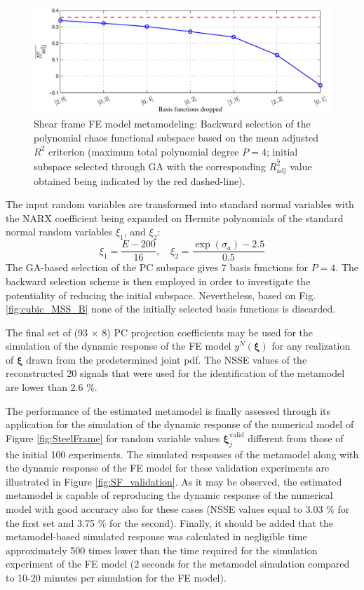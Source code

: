 \documentclass[preprint,3p,review,times,11pt]{elsarticle}
\newcommand{\beq}{\begin{equation}}
\newcommand{\eeq}{\end{equation}}
\newcommand{\bld}[1]{\boldsymbol{#1}}
\newcommand{\bxi}{\bld{\xi}}
\begin{document}
\begin{figure}[t!]
\begin{center}
\includegraphics[width = 1\textwidth]{figs/SF_MSS_StageB.pdf}
\caption{Shear frame FE model metamodeling: Backward selection of the polynomial chaos functional subspace based on the mean adjusted $R^2$ criterion (maximum total polynomial degree $P=4$; initial subspace selected through GA with the corresponding $\overline{R^2_\text{adj}}$ value obtained being indicated by the red dashed-line).} \label{fig:boucwen_MSS_B}
\end{center}
\end{figure}


The input random variables are transformed into standard normal variables with the NARX coefficient being expanded on Hermite polynomials of the standard normal random variables $\xi_1$, and $\xi_2$:
\beq \xi_1 =  \frac{E - 200}{16} , \quad \xi_2 =  \frac{\exp(\sigma_a) - 2.5}{0.5}\eeq 
The GA-based selection of the PC subspace gives 7 basis functions for $P = 4$. The backward selection scheme is then employed in order to investigate the potentiality of reducing the initial subspace. Nevertheless, based on Fig. \ref{fig:cubic_MSS_B} none of the initially selected basis functions is discarded.   
 
The final set of (93 $\times$ 8) PC projection coefficients may be used for the simulation of the dynamic response of the FE model $y^N(\bxi)$ for any realization of $\bxi$ drawn from the predetermined joint pdf. The NSSE values of the reconstructed 20 signals that were used for the identification of the metamodel are lower than 2.6 \%. 

The performance of the estimated metamodel is finally assessed through its application for the simulation of the dynamic response of the numerical model of Figure \ref{fig:SteelFrame} for random variable values $\bxi^{\text{valid}}_j$ different from those of the initial 100 experiments. The simulated responses of the metamodel along with the dynamic response of the FE model for these validation experiments are illustrated in Figure \ref{fig:SF_validation}. As it may be observed, the estimated metamodel is capable of reproducing the dynamic response of the numerical model with good accuracy also for these cases (NSSE values equal to 3.03 $\%$ for the first set and 3.75 $\%$ for the second). Finally, it should be added that the metamodel-based simulated response was calculated in negligible time approximately 500 times lower than the time required for the simulation experiment of the FE model (2 seconds for the metamodel simulation compared to 10-20 minutes per simulation for the FE model).
\end{document}
